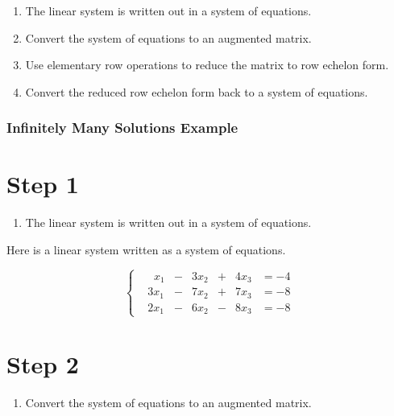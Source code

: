 \documentclass[
  letterpaper,
  DIV=11,
  numbers=noendperiod]{scrreprt}
\providecommand{\tightlist}{%
  \setlength{\itemsep}{0pt}\setlength{\parskip}{0pt}}\usepackage{longtable,booktabs,array}
\begin{document}

\begin{enumerate}
\def\labelenumi{\arabic{enumi}.}
\tightlist
\item
  The linear system is written out in a system of equations.
\item
  Convert the system of equations to an augmented matrix.
\item
  Use elementary row operations to reduce the matrix to row echelon
  form.
\item
  Convert the reduced row echelon form back to a system of equations.
\end{enumerate}

\hypertarget{infinitely-many-solutions-example}{%
\subsection*{Infinitely Many Solutions
Example}\label{infinitely-many-solutions-example}}

\chapter{Step 1}

\begin{enumerate}
\def\labelenumi{\arabic{enumi}.}
\tightlist
\item
  The linear system is written out in a system of equations.
\end{enumerate}

Here is a linear system written as a system of equations.

\[
\begin{cases}
&\;\;x_1 &- &3x_2 &+ &4x_3 &= -4 \\
&3x_1 &- &7x_2 &+ &7x_3 &= -8 \\
&2x_1 &- &6x_2 &- &8x_3 &= -8
\end{cases}
\]

\chapter{Step 2}

\begin{enumerate}
\def\labelenumi{\arabic{enumi}.}
\setcounter{enumi}{1}
\tightlist
\item
  Convert the system of equations to an augmented matrix.
\end{enumerate}
\end{document}
